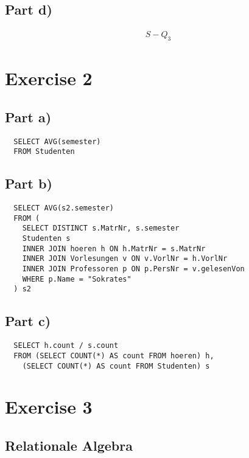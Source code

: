 \documentclass[10pt,a4paper]{article}
\begin{document}
\subsection*{Part d)}

\begin{align*}
  S - Q_{3}
\end{align*}

\section*{Exercise 2}

\subsection*{Part a)}

\begin{verbatim}
  SELECT AVG(semester)
  FROM Studenten
\end{verbatim}

\subsection*{Part b)}

\begin{verbatim}
  SELECT AVG(s2.semester)
  FROM (
    SELECT DISTINCT s.MatrNr, s.semester
    Studenten s
    INNER JOIN hoeren h ON h.MatrNr = s.MatrNr
    INNER JOIN Vorlesungen v ON v.VorlNr = h.VorlNr
    INNER JOIN Professoren p ON p.PersNr = v.gelesenVon
    WHERE p.Name = "Sokrates"
  ) s2
\end{verbatim}

\subsection*{Part c)}

\begin{verbatim}
  SELECT h.count / s.count
  FROM (SELECT COUNT(*) AS count FROM hoeren) h,
    (SELECT COUNT(*) AS count FROM Studenten) s
\end{verbatim}

\section*{Exercise 3}

\subsection*{Relationale Algebra}
\end{document}
